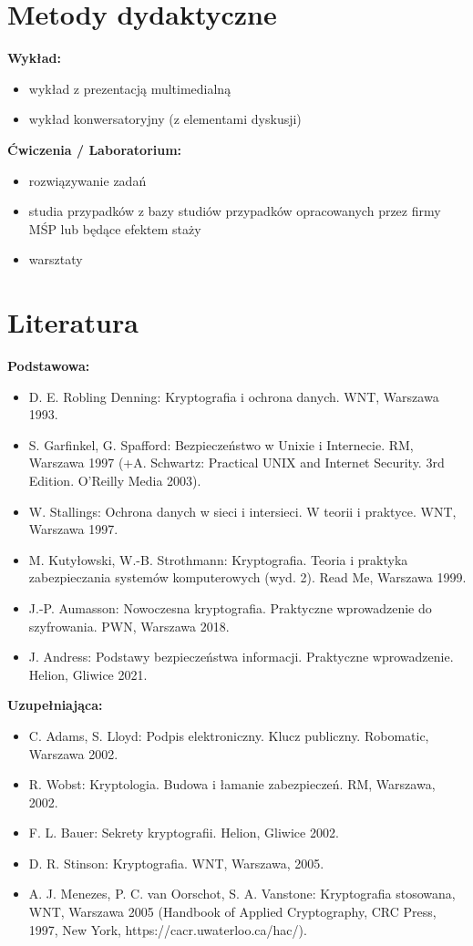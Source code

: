\documentclass[12pt, a4paper]{article}
\begin{document}
\section{Metody dydaktyczne}

\textbf{Wykład:}
\begin{itemize}
  \item wykład z prezentacją multimedialną
  \item wykład konwersatoryjny (z elementami dyskusji)
\end{itemize}
\vspace{4pt}
\textbf{Ćwiczenia / Laboratorium:}
\begin{itemize}
  \item rozwiązywanie zadań
  \item studia przypadków z bazy studiów przypadków opracowanych przez firmy MŚP lub będące efektem staży
  \item warsztaty
\end{itemize}
\vspace{4pt}


\section{Literatura}

\textbf{Podstawowa:}
\begin{itemize}
  \item D. E. Robling Denning: Kryptografia i ochrona danych. WNT, Warszawa 1993.
  \item S. Garfinkel, G. Spafford: Bezpieczeństwo w Unixie i Internecie. RM, Warszawa 1997 (+A. Schwartz: Practical UNIX and Internet Security. 3rd Edition. O'Reilly Media 2003).
  \item W. Stallings: Ochrona danych w sieci i intersieci. W teorii i praktyce. WNT, Warszawa 1997.
  \item M. Kutyłowski, W.-B. Strothmann: Kryptografia. Teoria i praktyka zabezpieczania systemów komputerowych (wyd. 2). Read Me, Warszawa 1999.
  \item J.-P. Aumasson: Nowoczesna kryptografia. Praktyczne wprowadzenie do szyfrowania. PWN, Warszawa 2018.
  \item J. Andress: Podstawy bezpieczeństwa informacji. Praktyczne wprowadzenie. Helion, Gliwice 2021.
\end{itemize}

\textbf{Uzupełniająca:}
\begin{itemize}
  \item C. Adams, S. Lloyd: Podpis elektroniczny. Klucz publiczny. Robomatic, Warszawa 2002.
  \item R. Wobst: Kryptologia. Budowa i łamanie zabezpieczeń. RM, Warszawa, 2002.
  \item F. L. Bauer: Sekrety kryptografii. Helion, Gliwice 2002.
  \item D. R. Stinson: Kryptografia. WNT, Warszawa, 2005.
  \item A. J. Menezes, P. C. van Oorschot, S. A. Vanstone: Kryptografia stosowana, WNT, Warszawa 2005 (Handbook of Applied Cryptography, CRC Press, 1997, New York, https://cacr.uwaterloo.ca/hac/).
\end{itemize}
\end{document}
